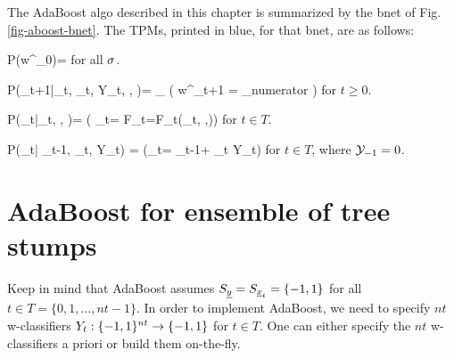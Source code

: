 The AdaBoost algo 
described
in this chapter is summarized
by
the bnet of Fig.\ref{fig-aboost-bnet}.
The TPMs, printed in blue, for that
bnet, are as follows:

\beq\color{blue}
P(w^\s_0)=
\;
\eeq
for all $\sigma$.

\beq\color{blue}
P(_{t+1}|_{t},
\alp_t, Y_t,    , )=
\prod_\s
\indi(\;\;\; 
w^\s_{t+1} =
{\sum_\s numerator}
\;\;\;)
\eeq
for $t\geq 0$.


\beq\color{blue}
P(\alp_t|_t, , )=
\indi(\;\;\; \alp_t=
\ln{}
F_t=F_t(_t, ,)\;\;\;) 
\eeq
for $t\in T$.

\beq\color{blue}
P(\caly_t| \caly_{t-1}, \alp_t, Y_t)
=
\indi(\;\;\;\caly_t= \caly_{t-1}+ \alp_t Y_t\;\;\;)
\eeq
for $t\in T$,
where ${\cal Y}_{-1}=0$.

\section{AdaBoost for ensemble of tree stumps}

Keep in mind that
AdaBoost assumes
$S_{\underline{y}}=S_{{\underline{x}}_t}=\{-1, 1\}$
for all $t\in T=\{0,1, \ldots, nt-1\}$.
In order to implement 
AdaBoost, we need to
specify 
$nt$
w-classifiers $Y_t:\{-1, 1\}^{nt}
\rightarrow \{-1, 1\}$ for $t\in T$.
One can either
specify the $nt$ w-classifiers
a priori or build them
on-the-fly.

